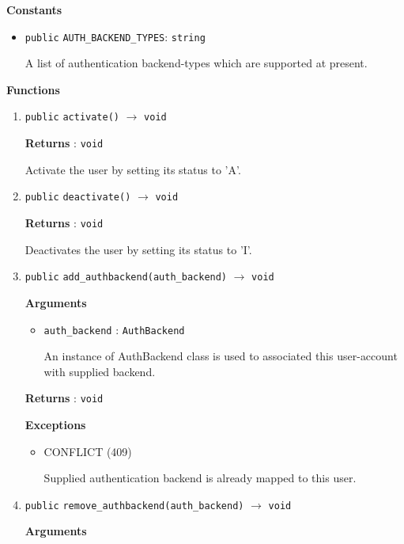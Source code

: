 \documentclass{article}%
\begin{document}
%
\par%
\vspace{0.25\baselineskip}%
\textbf{Constants}%
\begin{itemize}%
\item%
\verb|public| \verb|AUTH_BACKEND_TYPES|: \verb|string|%
\par%
A list of authentication backend{-}types which are supported at present.%
\end{itemize}%
\par%
\vspace{0.25\baselineskip}%
\textbf{Functions}%
\begin{enumerate}%
\hypertarget{ID:569129145}{}%
\item%
\xspace \texttt{public} \texttt{activate()} $\to$ \texttt{void}%
\par%
\small%
\textbf{Returns}%
\normalsize%
: %
\verb|void|%
\par%
Activate the user by setting its status to 'A'.%
\hypertarget{ID:711327396}{}%
\item%
\xspace \texttt{public} \texttt{deactivate()} $\to$ \texttt{void}%
\par%
\small%
\textbf{Returns}%
\normalsize%
: %
\verb|void|%
\par%
Deactivates the user by setting its status to 'I'.%
\hypertarget{ID:162567505}{}%
\item%
\xspace \texttt{public} \texttt{add\_authbackend(auth\_backend)} $\to$ \texttt{void}%
\par%
\small%
\textbf{Arguments}%
\normalsize%
\begin{itemize}%
\item%
\verb|auth_backend|%
: %
\verb|AuthBackend|%
\par%
An instance of AuthBackend class is used to associated this user{-}account with supplied backend.%
\end{itemize}%
\small%
\textbf{Returns}%
\normalsize%
: %
\verb|void|%
\par%
\small%
\textbf{Exceptions}%
\normalsize%
\begin{itemize}%
\item%
CONFLICT (409)%
\par%
Supplied authentication backend is already mapped to this user.%
\end{itemize}%
\hypertarget{ID:547111468}{}%
\item%
\xspace \texttt{public} \texttt{remove\_authbackend(auth\_backend)} $\to$ \texttt{void}%
\par%
\small%
\textbf{Arguments}%

\end{enumerate}
\end{document}
